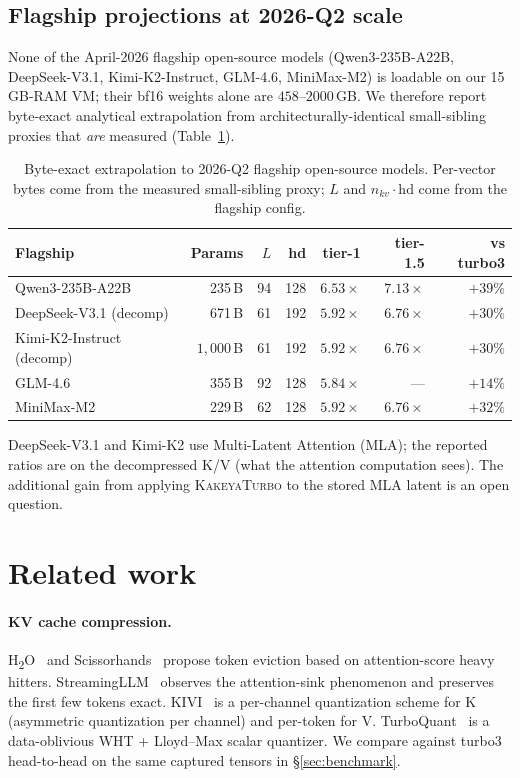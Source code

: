 \documentclass[11pt,a4paper]{article}
\theoremstyle{definition}
\theoremstyle{plain}
\begin{document}
\subsection{Flagship projections at 2026-Q2 scale}

None of the April-2026 flagship open-source models (Qwen3-235B-A22B, DeepSeek-V3.1, Kimi-K2-Instruct, GLM-4.6, MiniMax-M2) is loadable on our 15\,GB-RAM VM; their bf16 weights alone are $458$--$2000$\,GB. We therefore report byte-exact analytical extrapolation from architecturally-identical small-sibling proxies that \emph{are} measured (Table~\ref{tab:flagship}).

\begin{table}[H]
\centering
\small
\caption{Byte-exact extrapolation to 2026-Q2 flagship open-source models. Per-vector bytes come from the measured small-sibling proxy; $L$ and $n_{kv} \cdot \text{hd}$ come from the flagship config.}
\label{tab:flagship}
\begin{tabular}{lrrrrrr}
  \toprule
  Flagship & Params & $L$ & hd & tier-1 & tier-1.5 & vs turbo3 \\
  \midrule
  Qwen3-235B-A22B           & 235\,B & 94 & 128 & $6.53\times$ & $\mathbf{7.13\times}$ & $+39\%$ \\
  DeepSeek-V3.1 (decomp)    & 671\,B & 61 & 192 & $5.92\times$ & $6.76\times$ & $+30\%$ \\
  Kimi-K2-Instruct (decomp) & $1{,}000$\,B & 61 & 192 & $5.92\times$ & $6.76\times$ & $+30\%$ \\
  GLM-4.6                   & 355\,B & 92 & 128 & $5.84\times$ & ---              & $+14\%$ \\
  MiniMax-M2                & 229\,B & 62 & 128 & $5.92\times$ & $6.76\times$ & $+32\%$ \\
  \bottomrule
\end{tabular}
\end{table}

DeepSeek-V3.1 and Kimi-K2 use Multi-Latent Attention (MLA); the reported ratios are on the decompressed K/V (what the attention computation sees). The additional gain from applying \textsc{KakeyaTurbo} to the stored MLA latent is an open question.

\section{Related work}
\label{sec:related}

\paragraph{KV cache compression.} H\textsubscript{2}O~\cite{h2o} and Scissorhands~\cite{scissorhands} propose token eviction based on attention-score heavy hitters. StreamingLLM~\cite{streaming-llm} observes the attention-sink phenomenon and preserves the first few tokens exact. KIVI~\cite{kivi} is a per-channel quantization scheme for K (asymmetric quantization per channel) and per-token for V. TurboQuant~\cite{turboquant} is a data-oblivious WHT + Lloyd--Max scalar quantizer. We compare against turbo3 head-to-head on the same captured tensors in \S\ref{sec:benchmark}.
\end{document}
